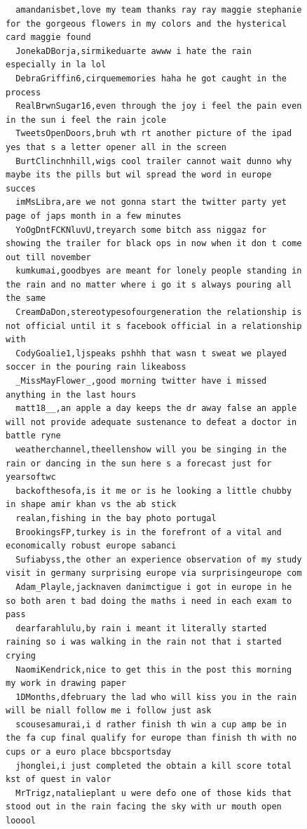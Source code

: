 \begin{figure}[htpb]
\begin{verbatim}
  amandanisbet,love my team thanks ray ray maggie stephanie for the gorgeous flowers in my colors and the hysterical card maggie found
  JonekaDBorja,sirmikeduarte awww i hate the rain especially in la lol
  DebraGriffin6,cirquememories haha he got caught in the process
  RealBrwnSugar16,even through the joy i feel the pain even in the sun i feel the rain jcole
  TweetsOpenDoors,bruh wth rt another picture of the ipad yes that s a letter opener all in the screen
  BurtClinchnhill,wigs cool trailer cannot wait dunno why maybe its the pills but wil spread the word in europe succes
  imMsLibra,are we not gonna start the twitter party yet page of japs month in a few minutes
  YoOgDntFCKNluvU,treyarch some bitch ass niggaz for showing the trailer for black ops in now when it don t come out till november
  kumkumai,goodbyes are meant for lonely people standing in the rain and no matter where i go it s always pouring all the same
  CreamDaDon,stereotypesofourgeneration the relationship is not official until it s facebook official in a relationship with
  CodyGoalie1,ljspeaks pshhh that wasn t sweat we played soccer in the pouring rain likeaboss
  _MissMayFlower_,good morning twitter have i missed anything in the last hours
  matt18__,an apple a day keeps the dr away false an apple will not provide adequate sustenance to defeat a doctor in battle ryne
  weatherchannel,theellenshow will you be singing in the rain or dancing in the sun here s a forecast just for yearsoftwc
  backofthesofa,is it me or is he looking a little chubby in shape amir khan vs the ab stick
  realan,fishing in the bay photo portugal
  BrookingsFP,turkey is in the forefront of a vital and economically robust europe sabanci
  Sufiabyss,the other an experience observation of my study visit in germany surprising europe via surprisingeurope com
  Adam_Playle,jacknaven danimctigue i got in europe in he so both aren t bad doing the maths i need in each exam to pass
  dearfarahlulu,by rain i meant it literally started raining so i was walking in the rain not that i started crying
  NaomiKendrick,nice to get this in the post this morning my work in drawing paper
  1DMonths,dfebruary the lad who will kiss you in the rain will be niall follow me i follow just ask
  scousesamurai,i d rather finish th win a cup amp be in the fa cup final qualify for europe than finish th with no cups or a euro place bbcsportsday
  jhonglei,i just completed the obtain a kill score total kst of quest in valor
  MrTrigz,natalieplant u were defo one of those kids that stood out in the rain facing the sky with ur mouth open looool

\end{verbatim}
\end{figure}
